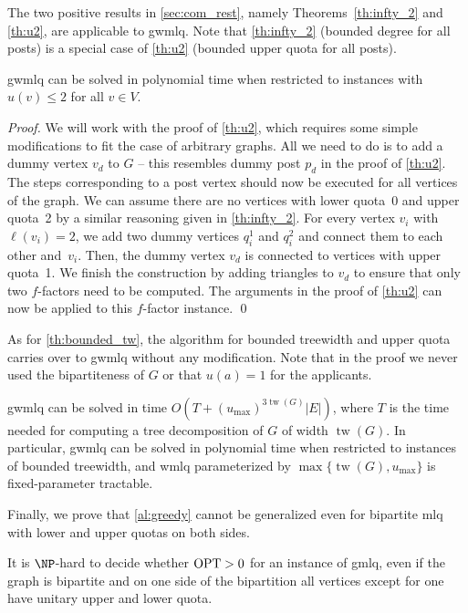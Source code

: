 \documentclass{llncs}
\newcommand{\OPT}{\textup{OPT}}
\newcommand{\tw}{\operatorname{tw}}
\begin{document}
The two positive results in \cref{sec:com_rest}, namely Theorems~\ref{th:infty_2} and \ref{th:u2}, are applicable to {\sc gwmlq}. Note that \cref{th:infty_2} (bounded degree for all posts) is a special case of \cref{th:u2} (bounded upper quota for all posts).

\begin{theorem}
	 {\sc gwmlq} can be solved in polynomial time when restricted to instances with $u(v) \leq 2$ for all $v \in V$.
\end{theorem}

\begin{proof}
We will work with the proof of \cref{th:u2}, which requires some simple modifications to fit the case of arbitrary graphs. All we need to do is to add a dummy vertex $v_d$ to $G$ -- this resembles dummy post $p_d$ in the proof of \cref{th:u2}. The steps corresponding to a post vertex should now be executed for all vertices of the graph. We can assume there are no vertices with lower quota~0 and upper quota~2 by a similar reasoning given in \cref{th:infty_2}. For every vertex $v_i$ with $ \ell(v_i) = 2$, we add two dummy vertices $q_i^1$ and $q_i^2$ and connect them to each other and~$v_i$.  Then, the dummy vertex $v_d$ is connected to vertices with upper quota~1. We finish the construction by adding triangles to $v_d$ to ensure that only two $f$-factors need to be computed. The arguments in the proof of \cref{th:u2} can now be applied to this $f$-factor instance. \qed
\end{proof}

As for \cref{th:bounded_tw}, the algorithm for bounded treewidth and upper quota carries over to {\sc gwmlq} without any modification. Note that in the proof we never used the bipartiteness of $G$ or that $u(a) =1$ for the applicants.

\begin{theorem}
	  {\sc gwmlq} can be solved in time $O(T + (u_{\max})^{3\tw(G)}|E|)$, where $T$ is the time needed for computing a tree decomposition of $G$ of width $\tw(G)$. In particular, {\sc gwmlq} can be solved in polynomial time when restricted to instances of bounded treewidth, and {\sc wmlq} parameterized by $\max\{\tw(G), u_{\max}\}$ is fixed-parameter tractable.
\end{theorem}

	Finally, we prove that \cref{al:greedy} cannot be generalized even for bipartite {\sc mlq} with lower and upper quotas on both sides.

\begin{theorem}
	It is $\NP$-hard to decide whether $\OPT > 0$ for an instance of {\sc gmlq}, even if the graph is bipartite and on one side of the bipartition all vertices except for one have unitary upper and lower quota.
\end{theorem}
\end{document}
